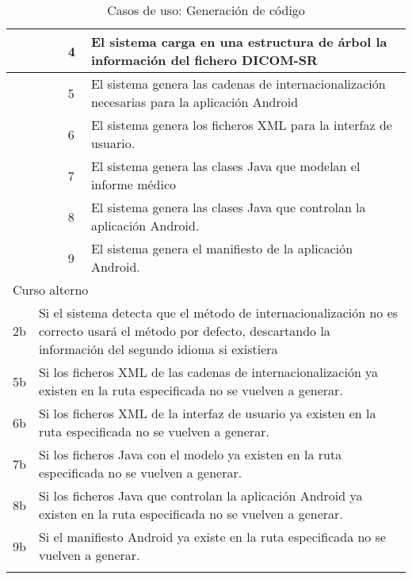 \begin{center}
\begin{longtable}{ |b{2.5cm}|b{4cm}|b{1cm}|b{2cm}|b{1.5cm}| b{2.5cm}| }
    \hline
    & \multicolumn{2}{|l|}{} & 4 &  \multicolumn{2}{|l|}{\parbox{5cm}{El sistema carga en una estructura de árbol la información del fichero DICOM-SR}}\\
    \hline
    & \multicolumn{2}{|l|}{} & 5 &  \multicolumn{2}{|l|}{\parbox{5cm}{El sistema genera las cadenas de internacionalización necesarias para la aplicación Android}}\\
    \hline
    & \multicolumn{2}{|l|}{} & 6 &  \multicolumn{2}{|l|}{\parbox{5cm}{El sistema genera los ficheros XML para la interfaz de usuario.}}\\
    \hline
    & \multicolumn{2}{|l|}{} & 7 &  \multicolumn{2}{|l|}{\parbox{5cm}{El sistema genera las clases Java que modelan el informe médico}}\\
    \hline
    & \multicolumn{2}{|l|}{} & 8 &  \multicolumn{2}{|l|}{\parbox{5cm}{El sistema genera las clases Java que controlan la aplicación Android.}}\\
    \hline
    & \multicolumn{2}{|l|}{} & 9 &  \multicolumn{2}{|l|}{\parbox{5cm}{El sistema genera el manifiesto de la aplicación Android.}}\\
    \hline
    \multicolumn{6}{|l|}{\parbox{8cm}{{\color{RubineRed} Curso alterno }}}  \\ 
    \hline
    2b & \multicolumn{5}{|l|}{\parbox{13cm}{Si el sistema detecta que el método de internacionalización no es correcto usará el método por defecto, descartando la información del segundo idioma si existiera}}  \\ 
        \hline
    5b & \multicolumn{5}{|l|}{\parbox{13cm}{Si los ficheros XML de las cadenas de internacionalización ya existen en la ruta especificada no se vuelven a generar.}}  \\ 
    \hline
    6b & \multicolumn{5}{|l|}{\parbox{13cm}{Si los ficheros XML de la interfaz de usuario ya existen en la ruta especificada no se vuelven a generar.}}  \\ 
	\hline
    7b & \multicolumn{5}{|l|}{\parbox{13cm}{Si los ficheros Java con el modelo ya existen en la ruta especificada no se vuelven a generar.}}  \\
	\hline
	8b & \multicolumn{5}{|l|}{\parbox{13cm}{Si los ficheros Java que controlan la aplicación Android ya existen en la ruta especificada no se vuelven a generar.}}  \\
	\hline
	9b & \multicolumn{5}{|l|}{\parbox{13cm}{Si el manifiesto Android ya existe en la ruta especificada no se vuelven a generar.}}  \\
	\hline
    \caption{Casos de uso: Generación de código}
  	\label{tab:casos-uso:gen}
    \end{longtable}
\end{center}

